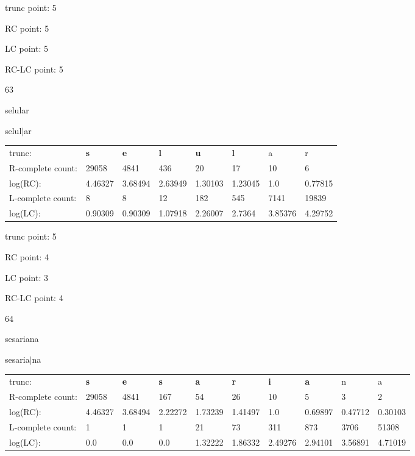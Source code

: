 \documentclass{article}
\begin{document}
trunc point: 5

RC point: 5

LC point: 5

RC-LC point: 5

\vspace{3em}



63

selular

selul$|$ar

\vspace{1em}

\begin{tabular}{l|lllllll}

trunc: & {\color{red}\bf s} & {\color{red}\bf e} & {\color{red}\bf l} & {\color{red}\bf u} & {\color{red}\bf l} & a & r \\ 
R-complete count: & 29058 & 4841 & 436 & 20 & 17 & 10 & 6 \\ 
log(RC): & 4.46327 & 3.68494 & 2.63949 & 1.30103 & 1.23045 & 1.0 & 0.77815 \\ 
L-complete count: & 8 & 8 & 12 & 182 & 545 & 7141 & 19839 \\ 
log(LC): & 0.90309 & 0.90309 & 1.07918 & 2.26007 & 2.7364 & 3.85376 & 4.29752 \\ 
\end{tabular}

trunc point: 5

RC point: 4

LC point: 3

RC-LC point: 4

\vspace{3em}



64

sesariana

sesaria$|$na

\vspace{1em}

\begin{tabular}{l|lllllllll}

trunc: & {\color{red}\bf s} & {\color{red}\bf e} & {\color{red}\bf s} & {\color{red}\bf a} & {\color{red}\bf r} & {\color{red}\bf i} & {\color{red}\bf a} & n & a \\ 
R-complete count: & 29058 & 4841 & 167 & 54 & 26 & 10 & 5 & 3 & 2 \\ 
log(RC): & 4.46327 & 3.68494 & 2.22272 & 1.73239 & 1.41497 & 1.0 & 0.69897 & 0.47712 & 0.30103 \\ 
L-complete count: & 1 & 1 & 1 & 21 & 73 & 311 & 873 & 3706 & 51308 \\ 
log(LC): & 0.0 & 0.0 & 0.0 & 1.32222 & 1.86332 & 2.49276 & 2.94101 & 3.56891 & 4.71019 \\ 
\end{tabular}
\end{document}
